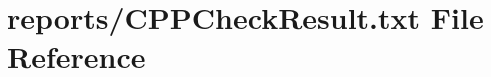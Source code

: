\hypertarget{CPPCheckResult_8txt}{}\section{reports/\+C\+P\+P\+Check\+Result.txt File Reference}
\label{CPPCheckResult_8txt}
